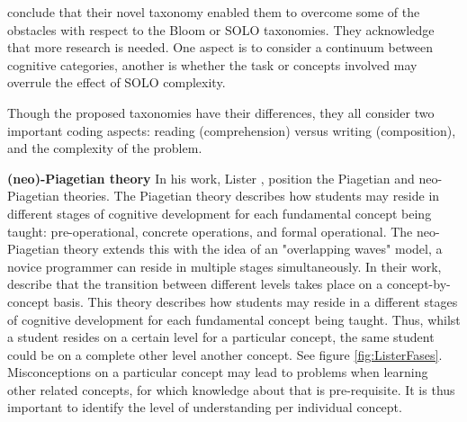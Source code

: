  conclude that their novel taxonomy enabled them to overcome some of the obstacles with respect to the Bloom or SOLO taxonomies. They acknowledge that more research is needed. One aspect is to consider a continuum between cognitive categories, another is whether the task or concepts involved may overrule the effect of SOLO complexity.



Though the proposed taxonomies have their differences, they all consider two important coding aspects: reading (comprehension) versus writing (composition), and the complexity of the problem.



\noindent \textbf{(neo)-Piagetian theory}\newline
In his work, Lister \citeyear{lister2010naturally}, \citeyear{lister2016toward} position the Piagetian and neo-Piagetian theories. The Piagetian theory describes how students may reside in different stages of cognitive development for each fundamental concept being taught: pre-operational, concrete operations, and formal operational. The neo-Piagetian theory extends this with the idea of an "overlapping waves" model, a novice programmer can reside in multiple stages simultaneously. In their work,  describe that the transition between different levels takes place on a concept-by-concept basis. This theory describes how students may reside in a different stages of cognitive development for each fundamental concept being taught. Thus, whilst a student resides on a certain level for a particular concept, the same student could be on a complete other level another concept. See figure \ref{fig:ListerFases}. Misconceptions on a particular concept may lead to problems when learning other related concepts, for which knowledge about that is pre-requisite. It is thus important to identify the level of understanding per individual concept.


